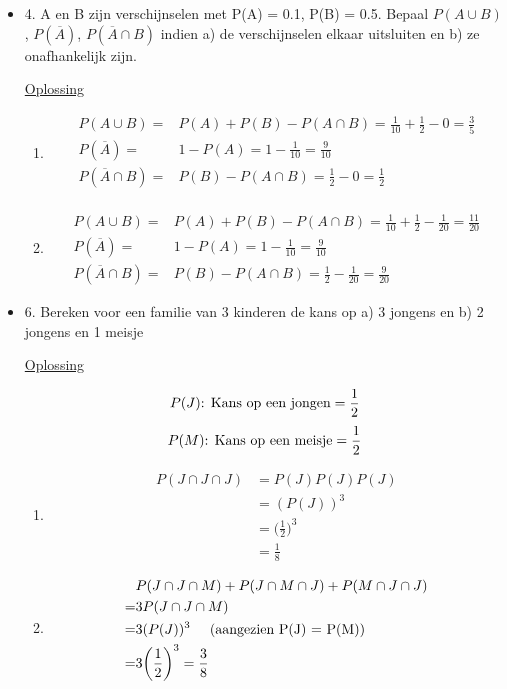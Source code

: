 \documentclass[12pt]{report}
\newcommand{\exercise}[2]{
  #1
  

  \underline{Oplossing}
  
  #2
  
    \hrulefill
}
\begin{document}
\begin{itemize}[label={}, leftmargin=*]
	  
	\item {\exercise{4. A en B zijn verschijnselen met P(A) = 0.1, P(B) = 0.5. Bepaal $P(A \cup B)$, $P(\overline{A})$, $P(\overline{A} \cap B)$ indien a) de verschijnselen elkaar uitsluiten en b) ze onafhankelijk zijn.}
		{
			\begin{enumerate}[label=(\alph*)]
				\item \begin{align*}
				      P(A \cup B) =  & P(A) + P(B) - P(A \cap B) = \frac{1}{10} + \frac{1}{2} - 0 = \frac{3}{5} \\
				      P(\overline{A}) =  & 1 - P(A) = 1 - \frac{1}{10} = \frac{9}{10} \\
				      P(\overline{A} \cap B) = & P(B) - P(A \cap B) = \frac{1}{2} - 0 = \frac{1}{2} \\
				\end{align*}
				\item \begin{align*}
				      P(A \cup B) = & P(A) + P(B)  - P(A \cap B) = \frac{1}{10} + \frac{1}{2} - \frac{1}{20} = \frac{11}{20} \\
				      P(\overline{A}) =  &1 - P(A) = 1 - \frac{1}{10} = \frac{9}{10} \\
				      P(\overline{A} \cap B) = & P(B) - P(A \cap B) = \frac{1}{2} - \frac{1}{20} = \frac{9}{20}
				\end{align*}
			\end{enumerate}}}
	
	\item \exercise{6. Bereken voor een familie van 3 kinderen de kans op a) 3 jongens en  b) 2 jongens en 1 meisje}{
	      $$P(J) \hbox{: Kans op een jongen} = \frac{1}{2}$$
	      $$P(M) \hbox{: Kans op een meisje} = \frac{1}{2}$$
	      \begin{enumerate}[label=(\alph*)]
	      	\item \begin{equation*}
	      	      \begin{split}
	      	      	P(J \cap J \cap J) & = P(J)P(J)P(J)\\
	      	      	& = (P(J))^{3} \\
	      	      	& = \bigg(\frac{1}{2}\bigg)^{3} \\
	      	      	& = \frac{1}{8}
	      	      \end{split}
	      	\end{equation*}
	      	\item \begin{equation*}
	      	      \begin{split}
	      	      	& P(J \cap J \cap M) + P(J \cap M \cap J) + P(M \cap J \cap J)  \\
	      	      	= & 3P(J \cap J \cap M)\\
	      	      	= & 3(P(J))^3 \;\;\;\;\; \hbox{(aangezien P(J) = P(M))} \\
	      	      	= & 3 \bigg(\frac{1}{2}\bigg)^{3} = \frac{3}{8}
	      	      \end{split}
	      	\end{equation*}
	      \end{enumerate}}
	      

\end{itemize}
\end{document}

